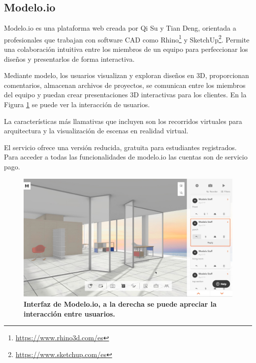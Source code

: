 \subsection{Modelo.io}

Modelo.io\citep{Modelo.io2018} es una plataforma web creada por Qi Su y Tian Deng, orientada a profesionales que trabajan con software CAD como Rhino\footnote{\url{https://www.rhino3d.com/es}} y SketchUp\footnote{\url{https://www.sketchup.com/es}}. Permite una colaboración intuitiva entre los miembros de un equipo para perfeccionar los diseños y presentarlos de forma interactiva.

Mediante modelo, los usuarios visualizan y exploran diseños en 3D, proporcionan comentarios, almacenan archivos de proyectos, se comunican entre los miembros del equipo y puedan crear presentaciones 3D interactivas para los clientes. En la Figura \ref{fig:modelo.io} se puede ver la interacción de usuarios.

La características más llamativas que incluyen son los recorridos virtuales para arquitectura y la visualización de escenas en realidad virtual.

El servicio ofrece una versión reducida, gratuita para estudiantes registrados. Para acceder a todas las funcionalidades de modelo.io las cuentas son de servicio pago.

\begin{figure}[h]
\includegraphics[width=14cm]{Img/WEB/web-modelo.jpg}
\centering
\caption{\textbf{ \footnotesize{Interfaz de Modelo.io, a la derecha se puede apreciar la interacción entre usuarios.}}}
\label{fig:modelo.io}
\end{figure}